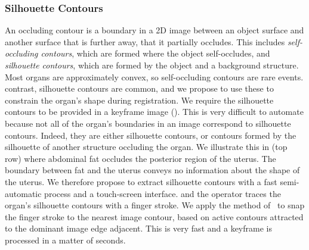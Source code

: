 


\subsubsection{Silhouette Contours}
An occluding contour is a boundary in a 2D image between an object surface and another surface that is further away, that it partially occludes. This includes  \emph{self-occluding contours}, which are formed where the object self-occludes, and \emph{silhouette contours}, which are formed by the object and a background structure. Most organs are approximately convex, so self-occluding contours are rare events.  contrast, silhouette contours are common, and we propose to use these to constrain the organ's shape during registration. We require the silhouette contours to be provided in a keyframe image (). This is very difficult to automate because not all of the organ's boundaries in an image correspond to silhouette contours. Indeed, they are either silhouette contours, or contours formed by the silhouette of another structure occluding the organ. We illustrate this in  (top row) where abdominal fat occludes the posterior region of the uterus. The boundary between fat and the uterus conveys no information about the shape of the uterus.  
We therefore propose to extract silhouette contours with a fast semi-automatic process and a touch-screen interface.  and the operator traces the organ's silhouette contours with a finger stroke. We apply the method of~\cite{Mortensen95intelligentscissors} to snap the finger stroke to the nearest image contour, based on active contours attracted to the dominant image edge adjacent. This is very fast and a keyframe is processed in a matter of seconds. %



